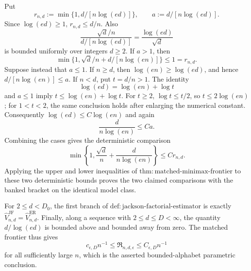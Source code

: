 Put
\[
 r_{n,d}:=\min\{1,d/[n\log(ed)]\},
 \qquad a:=d/[n\log(ed)].
\]
Since \(\log(ed)\geq1\), \(r_{n,d}\leq d/n\).  Also
\[
 \frac{\sqrt d/n}{d/[n\log(ed)]}=\frac{\log(ed)}{\sqrt d}
\]
is bounded uniformly over integers \(d\geq2\).  If \(a>1\), then
\[
 \min\{1,\sqrt d/n+d/[n\log(en)]\}\leq1=r_{n,d}.
\]
Suppose instead that \(a\leq1\).  If \(n\geq d\), then \(\log(en)\geq\log(ed)\), and hence \(d/[n\log(en)]\leq a\).  If \(n<d\), put \(t=d/n>1\).  The identity
\[
 \log(ed)=\log(en)+\log t
\]
and \(a\leq1\) imply \(t\leq\log(en)+\log t\).  For \(t\geq2\), \(\log t\leq t/2\), so \(t\leq2\log(en)\); for \(1<t<2\), the same conclusion holds after enlarging the numerical constant.  Consequently \(\log(ed)\leq C\log(en)\) and again
\[
 \frac d{n\log(en)}\leq C a.
\]
Combining the cases gives the deterministic comparison
\[
 \min\left\{1,\frac{\sqrt d}{n}+\frac d{n\log(en)}\right\}
 \leq C r_{n,d}.
 \tag{35}
\]
Applying the upper and lower inequalities of \(\mathrm{thm:matched\text{-}minimax\text{-}frontier}\) to these two deterministic bounds proves the two claimed comparisons with the banked bracket on the identical model class.

For \(2\leq d<D_0\), the first branch of \(\mathrm{def:jackson\text{-}factorial\text{-}estimator}\) is exactly
\(\widehat V_{n,d}^{\mathrm{JF}}=\widehat V_{n,d}^{\mathrm{ER}}\).  Finally, along a sequence with \(2\leq d\leq D<\infty\), the quantity \(d/\log(ed)\) is bounded above and bounded away from zero.  The matched frontier thus gives
\[
 c_{\epsilon,D}n^{-1}\leq\mathfrak R_{n,d,\epsilon}
 \leq C_{\epsilon,D}n^{-1}
\]
for all sufficiently large \(n\), which is the asserted bounded-alphabet parametric conclusion.